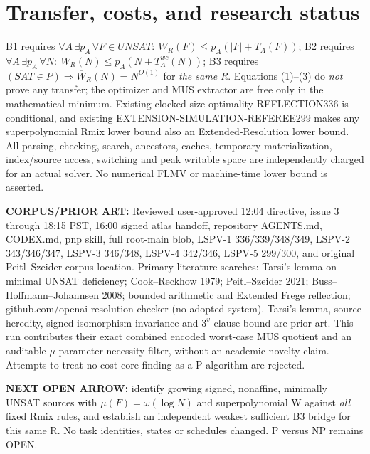 \documentclass[11pt]{article}
\begin{document}
\section*{Transfer, costs, and research status}
B1 requires $\forall A\,\exists p_A\,\forall F\in UNSAT:\ W_R(F)\le p_A(|F|+T_A(F))$; B2 requires $\forall A\,\exists p_A\,\forall N:\ \overline W_R(N)\le p_A(N+T_A^{wc}(N))$; B3 requires $(SAT\in P)\Rightarrow \overline W_R(N)=N^{O(1)}$ for \emph{the same R}. Equations (1)--(3) do \emph{not} prove any transfer; the optimizer and MUS extractor are free only in the mathematical minimum. Existing clocked size-optimality REFLECTION336 is conditional, and existing EXTENSION-SIMULATION-REFEREE299 makes any superpolynomial Rmix lower bound also an Extended-Resolution lower bound. All parsing, checking, search, ancestors, caches, temporary materialization, index/source access, switching and peak writable space are independently charged for an actual solver. No numerical FLMV or machine-time lower bound is asserted.

\noindent \textbf{CORPUS/PRIOR ART:} Reviewed user-approved 12:04 directive, issue 3 through 18:15 PST, 16:00 signed atlas handoff, repository AGENTS.md, CODEX.md, pnp skill, full root-main blob, LSPV-1 336/339/348/349, LSPV-2 343/346/347, LSPV-3 346/348, LSPV-4 342/346, LSPV-5 299/300, and original Peitl--Szeider corpus location. Primary literature searches: Tarsi's lemma on minimal UNSAT deficiency; Cook--Reckhow 1979; Peitl--Szeider 2021; Buss--Hoffmann--Johannsen 2008; bounded arithmetic and Extended Frege reflection; github.com/openai resolution checker (no adopted system). Tarsi's lemma, source heredity, signed-isomorphism invariance and $3^v$ clause bound are prior art. This run contributes their exact combined encoded worst-case MUS quotient and an auditable $\mu$-parameter necessity filter, without an academic novelty claim. Attempts to treat no-cost core finding as a P-algorithm are rejected.

\textbf{NEXT OPEN ARROW:} identify growing signed, nonaffine, minimally UNSAT sources with $\mu(F)=\omega(\log N)$ and superpolynomial W against \emph{all} fixed Rmix rules, and establish an independent weakest sufficient B3 bridge for this same R. No task identities, states or schedules changed. P versus NP remains OPEN.


\end{document}

